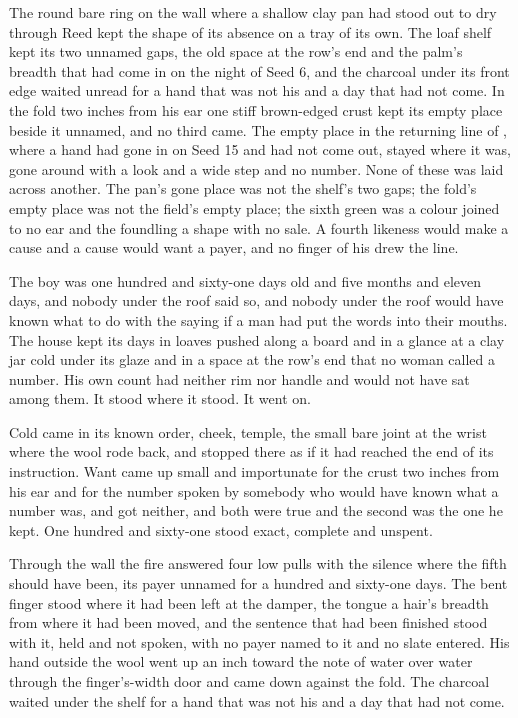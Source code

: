 The round bare ring on the wall where a shallow clay pan had stood out to dry through Reed kept the shape of its absence on a tray of its own. The loaf shelf kept its two unnamed gaps, the old space at the row's end and the palm's breadth that had come in on the night of Seed 6, and the charcoal under its front edge waited unread for a hand that was not his and a day that had not come. In the fold two inches from his ear one stiff brown-edged crust kept its empty place beside it unnamed, and no third came. The empty place in the returning line of , where a hand had gone in on Seed 15 and had not come out, stayed where it was, gone around with a look and a wide step and no number. None of these was laid across another. The pan's gone place was not the shelf's two gaps; the fold's empty place was not the field's empty place; the sixth green was a colour joined to no ear and the foundling a shape with no sale. A fourth likeness would make a cause and a cause would want a payer, and no finger of his drew the line.

\scenebreak

The boy was one hundred and sixty-one days old and five months and eleven days, and nobody under the roof said so, and nobody under the roof would have known what to do with the saying if a man had put the words into their mouths. The house kept its days in loaves pushed along a board and in a glance at a clay jar cold under its glaze and in a space at the row's end that no woman called a number. His own count had neither rim nor handle and would not have sat among them. It stood where it stood. It went on.

Cold came in its known order, cheek, temple, the small bare joint at the wrist where the wool rode back, and stopped there as if it had reached the end of its instruction. Want came up small and importunate for the crust two inches from his ear and for the number spoken by somebody who would have known what a number was, and got neither, and both were true and the second was the one he kept. One hundred and sixty-one stood exact, complete and unspent.

Through the wall the fire answered four low pulls with the silence where the fifth should have been, its payer unnamed for a hundred and sixty-one days. The bent finger stood where it had been left at the damper, the tongue a hair's breadth from where it had been moved, and the sentence that had been finished stood with it, held and not spoken, with no payer named to it and no slate entered. His hand outside the wool went up an inch toward the note of water over water through the finger's-width door and came down against the fold. The charcoal waited under the shelf for a hand that was not his and a day that had not come.
